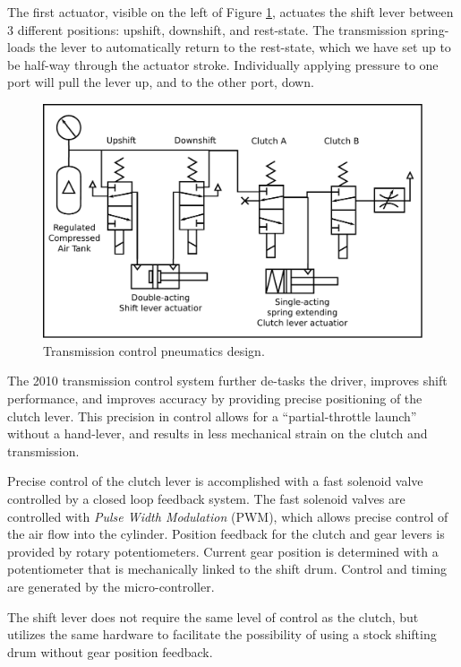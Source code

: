 The first actuator, visible on the left of Figure \ref{fig:pneumatics}, actuates the shift lever between 3 different positions: upshift, downshift, and rest-state. The transmission spring-loads the lever to automatically return to the rest-state, which we have set up to be half-way through the actuator stroke. Individually applying pressure to one port will pull the lever up, and to the other port, down.



\begin{figure}
  \centering
  \includegraphics[scale=0.5]{Figures/pneumatics.pdf}
  \caption{Transmission control pneumatics design.}
  \label{fig:pneumatics}
\end{figure}

The 2010 transmission control system further de-tasks the driver, improves shift performance, and improves accuracy by providing precise positioning of the clutch lever. This precision in control allows for a {}``partial-throttle launch'' without a hand-lever, and results in less mechanical strain on the clutch and transmission. 


Precise control of the clutch lever is accomplished with a fast solenoid valve controlled by a closed loop feedback system. The fast solenoid valves are controlled with \emph{Pulse Width Modulation} (PWM), which allows precise control of the air flow into the cylinder. Position feedback for the clutch and gear levers is provided by rotary potentiometers. Current gear position is determined with a potentiometer that is mechanically linked to the shift drum. Control and timing are generated by the micro-controller.

The shift lever does not require the same level of control as the clutch, but utilizes the same hardware to facilitate the possibility of using a stock shifting drum without gear position feedback.

